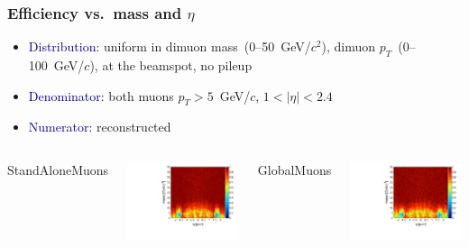 \documentclass[compress]{beamer}
\begin{document}
\begin{frame}
\frametitle{Efficiency vs.\ mass and $\eta$}
\begin{itemize}
\item \textcolor{darkblue}{Distribution:} uniform in dimuon mass~(0--50~GeV/$c^2$), dimuon $p_T$~(0--100~GeV/$c$), at the beamspot, no pileup

\item \textcolor{darkblue}{Denominator:} both muons $p_T > 5$~GeV/$c$, $1 < |\eta| < 2.4$

\item \textcolor{darkblue}{Numerator:} reconstructed
\end{itemize}

\vfill
\begin{columns}
\centering StandAloneMuons

\includegraphics[width=\linewidth]{masseta_StandAloneMuon.pdf}

\centering GlobalMuons

\includegraphics[width=\linewidth]{masseta_GlobalMuon.pdf}


\end{columns}
\end{frame}
\end{document}
